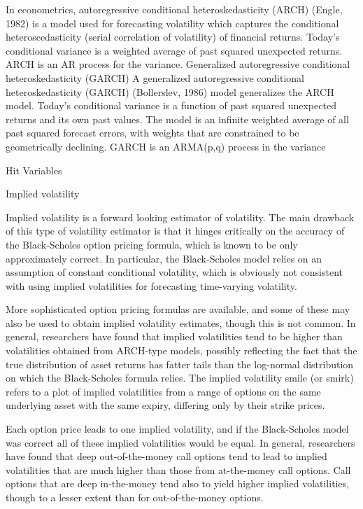 In econometrics, autoregressive conditional heteroskedasticity (ARCH) (Engle, 1982) is a model used for forecasting volatility which captures the conditional heteroscedasticity (serial correlation of volatility) of financial returns. Today's conditional variance is a weighted average of past squared unexpected returns. ARCH is an AR process for the variance.
Generalized autoregressive conditional heteroskedasticity (GARCH)
A generalized autoregressive conditional heteroskedasticity (GARCH) (Bollerslev, 1986) model generalizes the ARCH model. Today's conditional variance is a function of past squared unexpected returns and its own past values. The model is an infinite weighted average of all past squared forecast errors, with weights that are constrained to be geometrically declining. GARCH is an ARMA(p,q) process in the variance


Hit Variables

Implied volatility

Implied volatility is a forward looking estimator of volatility. The main drawback of this type of volatility estimator is that it hinges critically on the accuracy of the Black-Scholes option pricing formula, which is known to be only approximately correct. In particular, the Black-Scholes model relies on an assumption of constant conditional volatility, which is obviously not consistent with using implied volatilities for forecasting time-varying volatility. 

More sophisticated option pricing formulas are available, and some of these may also be used to obtain implied volatility estimates, though this is not common. In general, researchers have found that implied volatilities tend to be higher than volatilities obtained from ARCH-type models, possibly reﬂecting the fact that the true distribution of asset returns has fatter tails than the log-normal distribution on which the Black-Scholes formula relies. The implied volatility smile (or smirk) refers to a plot of implied volatilities from a range of options on the same underlying asset with the same expiry, diﬀering only by their strike prices. 

Each option price leads to one implied volatility, and if the Black-Scholes model was correct all of these implied volatilities would be equal. In general,
researchers have found that deep out-of-the-money call options tend to lead to implied volatilities that are much higher than those from at-the-money call options. Call options that are deep in-the-money tend also to yield higher implied volatilities, though to a lesser extent than for out-of-the-money options.

